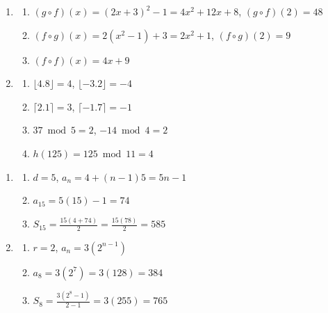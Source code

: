 \begin{enumerate}[resume*=anskey]
    \item
    \begin{enumerate}[label=\textbf{\thechapter.\arabic{enumi}.\arabic*}]
        \item $(g \circ f)(x) = (2x+3)^2 - 1 = 4x^2 + 12x + 8$, $(g \circ f)(2) = 48$
        \item $(f \circ g)(x) = 2(x^2-1) + 3 = 2x^2 + 1$, $(f \circ g)(2) = 9$
        \item $(f \circ f)(x) = 4x + 9$
    \end{enumerate}

    \item
    \begin{enumerate}[label=\textbf{\thechapter.\arabic{enumi}.\arabic*}]
        \item $\lfloor 4.8 \rfloor = 4$, $\lfloor -3.2 \rfloor = -4$
        \item $\lceil 2.1 \rceil = 3$, $\lceil -1.7 \rceil = -1$
        \item $37 \bmod 5 = 2$, $-14 \bmod 4 = 2$
        \item $h(125) = 125 \bmod 11 = 4$
    \end{enumerate}
\end{enumerate}

\begin{enumerate}[resume*=anskey]
    \item
    \begin{enumerate}[label=\textbf{\thechapter.\arabic{enumi}.\arabic*}]
        \item $d = 5$, $a_n = 4 + (n-1)5 = 5n - 1$
        \item $a_{15} = 5(15) - 1 = 74$
        \item $S_{15} = \frac{15(4 + 74)}{2} = \frac{15(78)}{2} = 585$
    \end{enumerate}

    \item
    \begin{enumerate}[label=\textbf{\thechapter.\arabic{enumi}.\arabic*}]
        \item $r = 2$, $a_n = 3(2^{n-1})$
        \item $a_8 = 3(2^7) = 3(128) = 384$
        \item $S_8 = \frac{3(2^8 - 1)}{2 - 1} = 3(255) = 765$
    \end{enumerate}
\end{enumerate}

